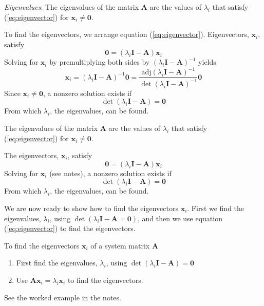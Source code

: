 \emph{Eigenvalues}: The eigenvalues of the matrix $\mathbf{A}$ are the values of $\lambda_i$ that satisfy (\ref{eq:eigenvector}) for $\mathbf{x}_i\ne \mathbf{0}$.

To find the eigenvectors, we arrange equation (\ref{eq:eigenvector}). Eigenvectors, $\mathbf{x}_i$, satisfy
\begin{equation}\label{eq:581}
	\mathbf{0}=(\lambda_i\mathbf{I}-\mathbf{A})\mathbf{x}_i 
\end{equation}
Solving for $\mathbf{x}_i$ by premultiplying both sides by $(\lambda_i\mathbf{I}-\mathbf{A})^{-1}$ yields
\[
	\mathbf{x}_i = (\lambda_i\mathbf{I}-\mathbf{A})^{-1}\mathbf{0} = 
	       \frac{\textrm{adj}(\lambda_i\mathbf{I}-\mathbf{A})^{-1}}{\det(\lambda_i\mathbf{I}-\mathbf{A})^{-1}}\mathbf{0} 
\]
Since $\mathbf{x}_i\ne \mathbf{0}$, a nonzero solution exists if
\begin{equation}\label{eq:eigenvalue}
	\det(\lambda_i\mathbf{I}-\mathbf{A}) = \mathbf{0} \label{eq:eigenvalue}
\end{equation}
From which $\lambda_i$, the eigenvalues, can be found.
\ifslidesonly
\begin{slide}
The eigenvalues of the matrix $\mathbf{A}$ are the values of $\lambda_i$ that satisfy (\ref{eq:eigenvector}) for $\mathbf{x}_i\ne \mathbf{0}$.

The eigenvectors, $\mathbf{x}_i$, satisfy
\begin{equation}
	\mathbf{0}=(\lambda_i\mathbf{I}-\mathbf{A})\mathbf{x}_i \label{eq:581} 
\end{equation}
Solving for $\mathbf{x}_i$ (see notes), a nonzero solution exists if
\begin{equation}\label{eq:eigenvalue}
	\det(\lambda_i\mathbf{I}-\mathbf{A}) = \mathbf{0} \label{eq:eigenvalue}
\end{equation}   
From which $\lambda_i$, the eigenvalues, can be found.
\end{slide}
\fi

We are now ready to show how to find the eigenvectors $\mathbf{x}_i$. First we find the eigenvalues, $\lambda_i$, using $\det(\lambda_i\mathbf{I}-\mathbf{A} = \mathbf{0})$, and then we use equation (\ref{eq:eigenvector}) to find the eigenvectors.

\ifslidesonly
\begin{slide}
   To find the eigenvectors $\mathbf{x}_i$ of a system matrix $\mathbf{A}$
\begin{enumerate}
   	\item First find the eigenvalues, $\lambda_i$, using $\det(\lambda_i\mathbf{I}-\mathbf{A}) = \mathbf{0}$
   	\item Use $\mathbf{A}\mathbf{x}_i=\lambda_i\mathbf{x}_i$ to find the eigenvectors.
   \end{enumerate}
   See the worked example in the notes.
\end{slide}
\fi

